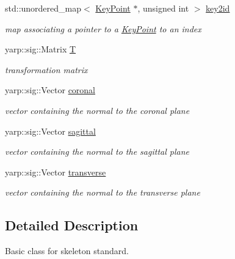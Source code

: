 \begin{DoxyCompactItemize}
std\+::unordered\+\_\+map$<$ \mbox{\hyperlink{classassistive__rehab_1_1KeyPoint}{Key\+Point}} $\ast$, unsigned int $>$ \mbox{\hyperlink{classassistive__rehab_1_1Skeleton_a4b1c3607cabb58053e4c367015e98e28}{key2id}}
\begin{DoxyCompactList}\small\item\em map associating a pointer to a \mbox{\hyperlink{classassistive__rehab_1_1KeyPoint}{Key\+Point}} to an index \end{DoxyCompactList}\item 
\mbox{\label{classassistive__rehab_1_1Skeleton_a358a1c5eb23a562f8558ff8d43583ef7}} 
yarp\+::sig\+::\+Matrix \mbox{\hyperlink{classassistive__rehab_1_1Skeleton_a358a1c5eb23a562f8558ff8d43583ef7}{T}}
\begin{DoxyCompactList}\small\item\em transformation matrix \end{DoxyCompactList}\item 
\mbox{\label{classassistive__rehab_1_1Skeleton_ad042a7e60e6d72cc87b06c5fb0bdfae2}} 
yarp\+::sig\+::\+Vector \mbox{\hyperlink{classassistive__rehab_1_1Skeleton_ad042a7e60e6d72cc87b06c5fb0bdfae2}{coronal}}
\begin{DoxyCompactList}\small\item\em vector containing the normal to the coronal plane \end{DoxyCompactList}\item 
\mbox{\label{classassistive__rehab_1_1Skeleton_a72d6ccb619619e77a17258b08496a972}} 
yarp\+::sig\+::\+Vector \mbox{\hyperlink{classassistive__rehab_1_1Skeleton_a72d6ccb619619e77a17258b08496a972}{sagittal}}
\begin{DoxyCompactList}\small\item\em vector containing the normal to the sagittal plane \end{DoxyCompactList}\item 
\mbox{\label{classassistive__rehab_1_1Skeleton_ab8a9bf9297f520e8de801248e0b8d2dd}} 
yarp\+::sig\+::\+Vector \mbox{\hyperlink{classassistive__rehab_1_1Skeleton_ab8a9bf9297f520e8de801248e0b8d2dd}{transverse}}
\begin{DoxyCompactList}\small\item\em vector containing the normal to the transverse plane \end{DoxyCompactList}\end{DoxyCompactItemize}


\subsection{Detailed Description}
Basic class for skeleton standard. 

